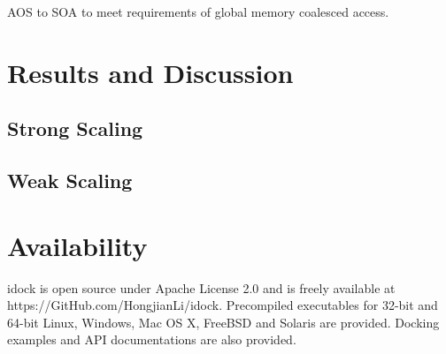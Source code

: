 \documentclass[10pt, conference, compsocconf]{../IEEEtran}
\begin{document}
AOS to SOA to meet requirements of global memory coalesced access.

\section{Results and Discussion}

\subsection{Strong Scaling}



\subsection{Weak Scaling}



\section{Availability}

idock is open source under Apache License 2.0 and is freely available at https://GitHub.com/HongjianLi/idock. Precompiled executables for 32-bit and 64-bit Linux, Windows, Mac OS X, FreeBSD and Solaris are provided. Docking examples and API documentations are also provided.



\end{document}
